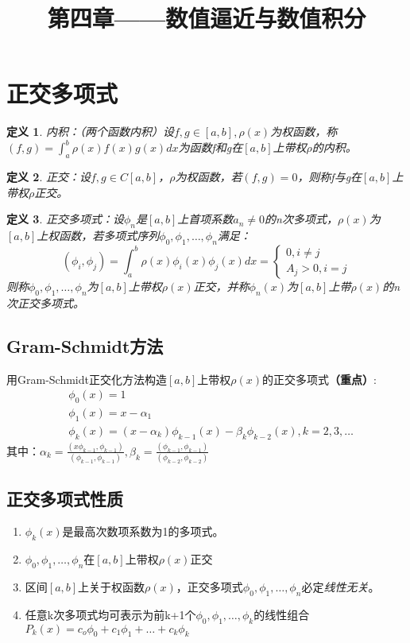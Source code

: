 \documentclass[a4paper]{article}
\newtheorem{definition}{定义}[section]
\begin{document}
\title{第四章——数值逼近与数值积分}
\author{}
\date{}
\maketitle

\section{正交多项式}
\begin{definition}
    内积：（两个函数内积）设$f,g \in [a,b], \rho(x)$为权函数，称$(f, g) = \int^b_a\rho(x)f(x)g(x)dx$为函数f和g在$[a,b]$上带权$\rho$的内积。
\end{definition}

\begin{definition}
    正交：设$f,g\in C[a,b]$，$\rho$为权函数，若$(f,g)=0$，则称f与g在$[a,b]$上带权$\rho$正交。
\end{definition}

\begin{definition}
    正交多项式：设$\phi_n$是$[a,b]$上首项系数$a_n\neq 0$的n次多项式，$\rho(x)$为$[a,b]$上权函数，若多项式序列$\phi_0, \phi_1, \dots, \phi_n$满足：
    $$(\phi_i, \phi_j)=\int^b_a\rho(x)\phi_i(x)\phi_j(x)dx = \left\{\begin{array}{lr}
        0, i\neq j \\ A_j > 0, i=j
    \end{array}\right.$$则称$\phi_0, \phi_1, \dots, \phi_n$为$[a,b]$上带权$\rho(x)$正交，并称$\phi_n(x)$为$[a,b]$上带$\rho(x)$的n次正交多项式。
\end{definition}

\subsection{Gram-Schmidt方法}
用Gram-Schmidt正交化方法构造$[a,b]$上带权$\rho(x)$的正交多项式\textbf{（重点）}:
\begin{align*}
    &\phi_0(x) = 1\\
    &\phi_1(x) = x - \alpha_1 \\
    &\phi_k(x) = (x-\alpha_k)\phi_{k-1}(x) - \beta_k\phi_{k-2}(x), k=2,3,\dots
\end{align*}
其中：$\alpha_k = \frac{(x\phi_{k-1}, \phi_{k-1})}{(\phi_{k-1}, \phi_{k-1})}, \beta_k = \frac{(\phi_{k-1}, \phi_{k-1})}{(\phi_{k-2}, \phi_{k-2})}$

\subsection{正交多项式性质}
\begin{enumerate}
    \item $\phi_k(x)$是最高次数项系数为1的多项式。
    \item $\phi_0, \phi_1, \dots, \phi_n$在$[a,b]$上带权$\rho(x)$正交
    \item 区间$[a,b]$上关于权函数$\rho(x)$，正交多项式$\phi_0, \phi_1, \dots, \phi_n$必定\textit{线性无关}。
    \item 任意k次多项式均可表示为前k+1个$\phi_0, \phi_1, \dots, \phi_k$的线性组合$P_k(x) = c_o\phi_0 + c_1\phi_1 + \dots + c_k\phi_k$
\end{enumerate}
\end{document}
